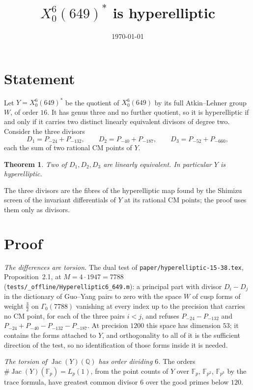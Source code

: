 \documentclass[11pt,reqno]{amsart}
\theoremstyle{plain}
\newtheorem{theorem}{Theorem}[section]
\theoremstyle{definition}
\DeclareMathOperator{\Jac}{Jac}
\newcommand{\Q}{\mathbb{Q}}
\newcommand{\F}{\mathbb{F}}
\begin{document}
\title{$X_0^{6}(649)^*$ is hyperelliptic}
\author{}
\date{\today}
\maketitle

\section{Statement}

Let $Y=X_0^6(649)^*$ be the quotient of $X_0^6(649)$ by its full Atkin--Lehner group $W$, of order $16$. It has
genus three and no further quotient, so it is hyperelliptic if and only if it carries two distinct linearly
equivalent divisors of degree two. Consider the three divisors
\[
D_1=P_{-24}+P_{-132},\qquad D_2=P_{-40}+P_{-187},\qquad D_3=P_{-52}+P_{-660},
\]
each the sum of two rational CM points of $Y$.

\begin{theorem}\label{thm:main}
Two of $D_1,D_2,D_3$ are linearly equivalent. In particular $Y$ is hyperelliptic.
\end{theorem}

The three divisors are the fibres of the hyperelliptic map found by the Shimizu screen of the invariant
differentials of $Y$ at its rational CM points; the proof uses them only as divisors.

\section{Proof}

\emph{The differences are torsion.} The dual test of \texttt{paper/hyperelliptic-15-38.tex}, Proposition~2.1,
at $M=4\cdot1947=7788$ (\texttt{tests/\_offline/Hyperelliptic6\_649.m}): a principal part with divisor
$D_i-D_j$ in the dictionary of Guo--Yang pairs to zero with the space $W$ of cusp forms of weight $\tfrac32$ on
$\Gamma_0(7788)$ vanishing at every index up to the precision that carries no CM point, for each of the three
pairs $i<j$, and refuses $P_{-24}-P_{-132}$ and $P_{-24}+P_{-40}-P_{-132}-P_{-187}$. At precision $1200$ this space
has dimension $53$; it contains the forms attached to $Y$, and orthogonality to all of it is the sufficient
direction of the test, so no identification of those forms inside it is needed.

\emph{The torsion of $\Jac(Y)(\Q)$ has order dividing $6$.} The orders $\#\Jac(Y)(\F_p)=L_p(1)$, from the
point counts of $Y$ over $\F_p$, $\F_{p^2}$, $\F_{p^3}$ by the trace formula, have greatest common divisor $6$
over the good primes below $120$.
\end{document}
